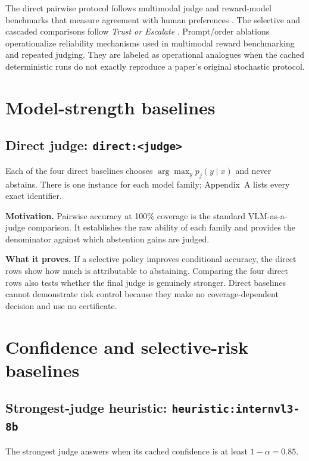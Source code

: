 \documentclass[10pt]{article}
\DeclareRobustCommand{\method}[1]{\nolinkurl{#1}}
\begin{document}
The direct pairwise protocol follows multimodal judge and reward-model benchmarks that
measure agreement with human preferences \cite{chen2024mllmjudge,yasunaga2025mmrb,li2024vlreward}.
The selective and cascaded comparisons follow \emph{Trust or Escalate}
\cite{jung2024trust}. Prompt/order ablations operationalize reliability mechanisms used
in multimodal reward benchmarking and repeated judging. They are labeled as operational
analogues when the cached deterministic runs do not exactly reproduce a paper's original
stochastic protocol.

\section{Model-strength baselines}

\subsection[Direct judge]{Direct judge: \method{direct:<judge>}}

Each of the four direct baselines chooses $\arg\max_y p_j(y\mid x)$ and never abstains.
There is one instance for each model family; Appendix~A lists every exact identifier.

\textbf{Motivation.} Pairwise accuracy at 100\% coverage is the standard
VLM-as-a-judge comparison. It establishes the raw ability of each family and provides
the denominator against which abstention gains are judged.

\textbf{What it proves.} If a selective policy improves conditional accuracy, the direct
rows show how much is attributable to abstaining. Comparing the four direct rows also
tests whether the final judge is genuinely stronger. Direct baselines cannot demonstrate
risk control because they make no coverage-dependent decision and use no certificate.

\section{Confidence and selective-risk baselines}

\subsection[Strongest-judge heuristic]{Strongest-judge heuristic: \method{heuristic:internvl3-8b}}

The strongest judge answers when its cached confidence is at least $1-\alpha=0.85$.
\end{document}
